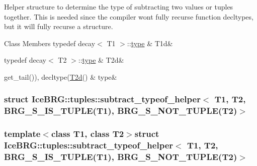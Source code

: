 Helper structure to determine the type of subtracting two values or tuples together. This is needed since the compiler won\textquotesingle{}t fully recurse function decltypes, but it will fully recurse a structure. \begin{DoxyFields}{Class Members}
\hypertarget{namespaceIceBRG_1_1tuples_a1b8bb4d7aee76ef5720b840bcf38e892}{}typedef decay$<$ T1 $>$\+::\hyperlink{namespaceIceBRG_1_1tuples_a31f2a5c17258aa6e326dc7423d396485}{type}\label{namespaceIceBRG_1_1tuples_a1b8bb4d7aee76ef5720b840bcf38e892}
&
T1d&
\\
\hline

\hypertarget{namespaceIceBRG_1_1tuples_a3e7f1fdd6036bc7e27edaeecc8916b4a}{}typedef decay$<$ T2 $>$\+::\hyperlink{namespaceIceBRG_1_1tuples_a31f2a5c17258aa6e326dc7423d396485}{type}\label{namespaceIceBRG_1_1tuples_a3e7f1fdd6036bc7e27edaeecc8916b4a}
&
T2d&
\\
\hline

\hypertarget{namespaceIceBRG_1_1tuples_a31f2a5c17258aa6e326dc7423d396485}{}get\+\_\+tail()), decltype(\hyperlink{namespaceIceBRG_1_1tuples_a3e7f1fdd6036bc7e27edaeecc8916b4a}{T2d}()\label{namespaceIceBRG_1_1tuples_a31f2a5c17258aa6e326dc7423d396485}
&
type&
\\
\hline

\end{DoxyFields}
\label{structIceBRG_1_1tuples_1_1subtract__typeof__helper_3_01T1_00_01T2_00_01BRG__S__IS__TUPLE_07T1_08131694fe54a3c7a6002fbebfff754799}
\hypertarget{namespaceIceBRG_1_1tuples_structIceBRG_1_1tuples_1_1subtract__typeof__helper_3_01T1_00_01T2_00_01BRG__S__IS__TUPLE_07T1_08131694fe54a3c7a6002fbebfff754799}{}
\subsubsection{struct Ice\+B\+R\+G\+:\+:tuples\+:\+:subtract\+\_\+typeof\+\_\+helper$<$ T1, T2, B\+R\+G\+\_\+\+S\+\_\+\+I\+S\+\_\+\+T\+U\+P\+L\+E(T1), B\+R\+G\+\_\+\+S\+\_\+\+N\+O\+T\+\_\+\+T\+U\+P\+L\+E(T2)$>$}
\subsubsection*{template$<$class T1, class T2$>$struct Ice\+B\+R\+G\+::tuples\+::subtract\+\_\+typeof\+\_\+helper$<$ T1, T2, B\+R\+G\+\_\+\+S\+\_\+\+I\+S\+\_\+\+T\+U\+P\+L\+E(\+T1), B\+R\+G\+\_\+\+S\+\_\+\+N\+O\+T\+\_\+\+T\+U\+P\+L\+E(\+T2)$>$}


